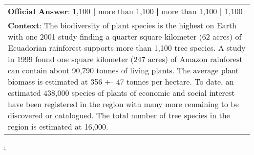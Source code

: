 \begin{figure*}[ht]
{\begin{tabular}{p{}}
            \textbf{Official Answer}: 1,100 \textbf{|} more than 1,100 \textbf{|} more than 1,100 \textbf{|} 1,100                                                                                                                                                                                                                                                                                                                                                                                                                                                                                                                                                                 \\
            \textbf{Context}: The biodiversity of plant species is the highest on Earth with one 2001 study finding a quarter square kilometer (62 acres) of Ecuadorian rainforest supports more than 1,100 tree species. A study in 1999 found one square kilometer (247 acres) of Amazon rainforest can contain about 90,790 tonnes of living plants. The average plant biomass is estimated at 356 +- 47 tonnes per hectare. To date, an estimated 438,000 species of plants of economic and social interest have been registered in the region with many more remaining to be discovered or catalogued. The total number of tree species in the region is estimated at 16,000. \\
        \end{tabular}
    };
    \label{fig:ex-5726722bdd62a815002e8529}
\end{figure*}

